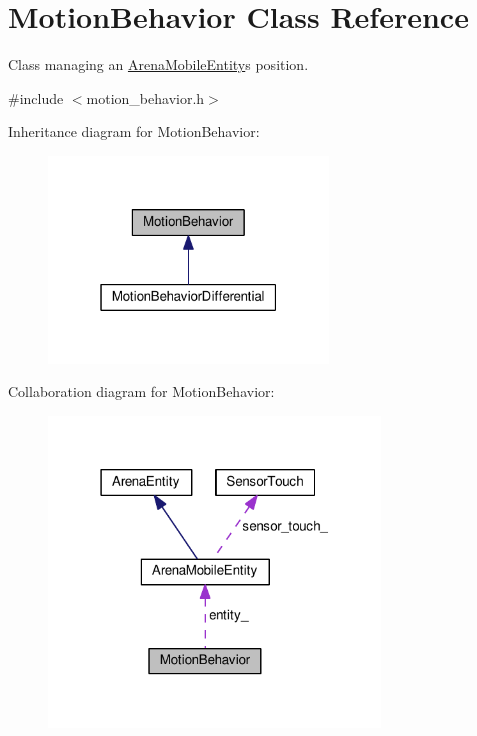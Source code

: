 \hypertarget{classMotionBehavior}{}\section{Motion\+Behavior Class Reference}
\label{classMotionBehavior}


Class managing an \hyperlink{classArenaMobileEntity}{Arena\+Mobile\+Entity}\textquotesingle{}s position.  




{\ttfamily \#include $<$motion\+\_\+behavior.\+h$>$}



Inheritance diagram for Motion\+Behavior\+:
\nopagebreak
\begin{figure}[H]
\begin{center}
\leavevmode
\includegraphics[width=211pt]{classMotionBehavior__inherit__graph}
\end{center}
\end{figure}


Collaboration diagram for Motion\+Behavior\+:
\nopagebreak
\begin{figure}[H]
\begin{center}
\leavevmode
\includegraphics[width=250pt]{classMotionBehavior__coll__graph}
\end{center}
\end{figure}
